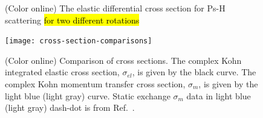 \documentclass[preprint,showpacs,showkeys,preprintnumbers,amsmath,amssymb,longbibliography,pra,aps]{revtex4-1}
\begin{document}
{%
%
%

\begin{figure}[H]%
    \centering
    \caption{(Color online) The elastic differential cross section for Ps-H scattering \hl{for two different rotations}}%
    \label{fig:combined-diff-cross-sections}%
\end{figure}

\begin{figure}[H]
	\centering
	\texttt{[image: cross-section-comparisons]}
	\caption{(Color online) Comparison of cross sections. The complex Kohn integrated
elastic cross section, $\sigma_{el}$, is given by the black curve. The complex
Kohn momentum transfer cross section, $\sigma_m$, is given by the light blue (light gray) curve.
Static exchange $\sigma_m$ data in light blue (light gray) dash-dot
is from Ref.~\cite{Hara1975}.}
	\label{fig:cross-section-comparisons}
\end{figure}

}
\end{document}
